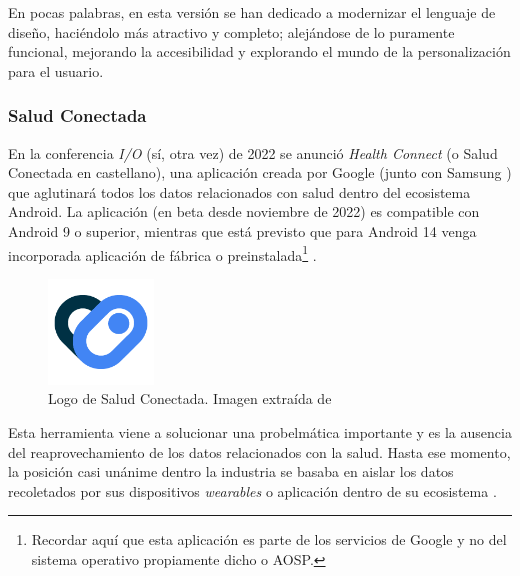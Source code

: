             En pocas palabras, en esta versión se han dedicado a modernizar el lenguaje de diseño, haciéndolo más 
            atractivo y completo; alejándose de lo puramente funcional, mejorando la accesibilidad y explorando 
            el mundo de la personalización para el usuario.

        \subsubsection{Salud Conectada}
            \label{section:salud_conectada}
            En la conferencia \textit{I/O} (sí, otra vez) de 2022 se anunció \textit{Health Connect} (o Salud Conectada
            en castellano), una aplicación creada por Google (junto con Samsung \cite{wilk_introducing_2022}) 
            que aglutinará todos los datos relacionados con salud dentro del ecosistema
            Android. La aplicación (en beta desde noviembre de 2022) es compatible con Android 9 o 
            superior, mientras que está previsto que para Android 14 venga
            incorporada aplicación de fábrica o preinstalada\footnote{Recordar aquí que esta aplicación es
            parte de los servicios de Google y no del sistema operativo propiamente dicho o AOSP.} 
            \cite{pandey_health_2023}. \newline

            \begin{figure}[h]
                \centering
                \includegraphics[width=0.25\textwidth]{figures/Health connect logo.png}
                \caption[Logo de Salud Conectada.]
                {Logo de Salud Conectada. Imagen extraída de \cite{noauthor_health_nodate}}
                \label{figure:health_connect:logo}
            \end{figure}

            Esta herramienta viene a solucionar una probelmática importante y es la ausencia del reaprovechamiento de 
            los datos relacionados con la salud. Hasta ese momento, la posición casi unánime dentro la 
            industria se basaba en aislar los datos recoletados por sus dispositivos \textit{wearables} o aplicación 
            dentro de su ecosistema \cite{ramirez_android_2022} \cite{rahman_android_2023}. \newline
            

